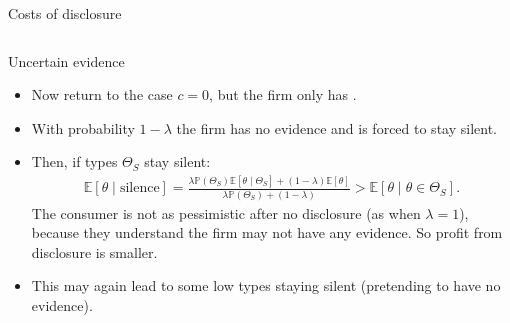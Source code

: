 \documentclass[english,10pt
,aspectratio=169
]{beamer}
\begin{document}
\begin{frame}{Costs of disclosure \citep{verrecchia_discretionary_1983}}
\begin{columns}
\begin{column}{0.4\linewidth}
	\end{column}
\end{columns}
\end{frame}


\begin{frame}{Uncertain evidence \citep{dye_disclosure_1985,jung_disclosure_1988}}
\begin{itemize}
	\item Now return to the case $c=0$, but the firm only has .
	\item With probability $1-\lambda$ the firm has no evidence and is forced to stay silent.
	\item Then, if types $\Theta_S$ stay silent:
	\begin{align*}
		\mathbb{E}[\theta \mid \text{silence}] = \frac{\lambda \mathbb{P}(\Theta_S) \mathbb{E}[\theta \mid \Theta_S] + (1-\lambda) \mathbb{E}[\theta]}{\lambda \mathbb{P}(\Theta_S) + (1-\lambda)} > \mathbb{E}[\theta \mid \theta \in \Theta_S].
	\end{align*}
	The consumer is not as pessimistic after no disclosure (as when $\lambda=1$), because they understand the firm may not have any evidence. So profit from disclosure is smaller.
	\item This may again lead to some low types staying silent (pretending to have no evidence).
\end{itemize}
\end{frame}
\end{document}
